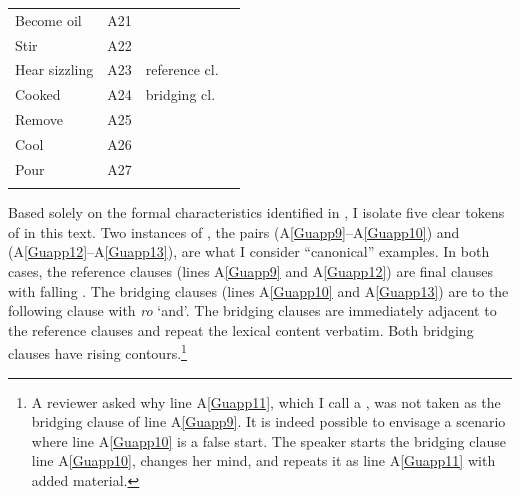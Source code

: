 \documentclass[output=paper]{LSP/langsci}
\begin{document}
\begin{table}[]
\begin{tabular}{lrll}
Become oil      & A21     &                 &                 \\
 Stir          & A22     &                &       \\
Hear sizzling   & A23     & reference cl.                  &                 \\
Cooked          & A24     & bridging cl. &                              \\
Remove          & A25     &                 &                 \\
Cool            & A26     &                 &                 \\
Pour            & A27     &                 &        \\        
\lspbottomrule
\end{tabular}
\end{table}

Based solely on the formal characteristics identified in , I isolate five clear tokens of  in this text. Two instances of , the pairs (A\ref{Guapp9}--A\ref{Guapp10}) and (A\ref{Guapp12}--A\ref{Guapp13}), are what I consider ``canonical'' examples. In both cases, the reference clauses (lines A\ref{Guapp9} and A\ref{Guapp12}) are final clauses with falling .  The bridging clauses (lines A\ref{Guapp10} and A\ref{Guapp13}) are  to the following clause with \textit{ro} `and'. The bridging clauses are immediately adjacent to the reference clauses and repeat the lexical content verbatim. Both bridging clauses have rising  contours.\footnote{A reviewer asked why line A\ref{Guapp11}, which I call a , was not taken as the bridging clause of line A\ref{Guapp9}. It is indeed possible to envisage a scenario where line A\ref{Guapp10} is a false start. The speaker starts the bridging clause line A\ref{Guapp10}, changes her mind, and repeats it as line A\ref{Guapp11} with added  material.}  
\end{document}
